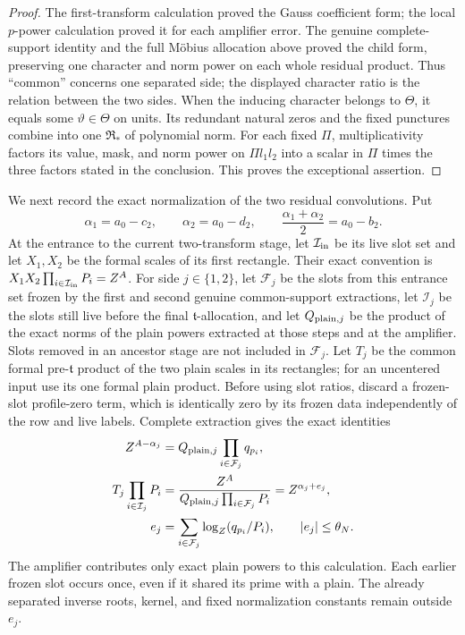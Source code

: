 \documentclass[11pt,a4paper]{article}
\numberwithin{equation}{section}
\numberwithin{figure}{section}
\theoremstyle{definition}
\theoremstyle{remark}
\begin{document}
\begin{proof}
The first-transform calculation proved the Gauss coefficient form; the
local \(p\)-power calculation proved it for each amplifier error.
The genuine complete-support identity and the full M\"obius allocation
above proved the child form, preserving one character and norm power on
each whole residual product.  Thus ``common'' concerns one separated side;
the displayed character ratio is the relation between the two sides.
When the inducing character belongs to \(\Theta\), it equals some
\(\vartheta\in\Theta\) on units.  Its redundant natural zeros and
the fixed punctures combine into one \(\mathfrak R_*\) of polynomial
norm.  For each fixed \(\Pi\), multiplicativity factors its value,
mask, and norm power on \(\Pi l_1l_2\) into a scalar in \(\Pi\)
times the three factors stated in the conclusion.  This proves the exceptional assertion.
\end{proof}

We next record the exact normalization of the two residual convolutions.  Put
\[
 \alpha_1=a_0-c_2,\qquad \alpha_2=a_0-d_2,\qquad
 \frac{\alpha_1+\alpha_2}{2}=a_0-b_2.
\]
At the entrance to the current two-transform stage, let
\(\mathcal I_{\rm in}\) be its live slot set and let \(X_1,X_2\)
be the formal scales of its first rectangle.  Their exact convention is
\(X_1X_2\prod_{i\in\mathcal I_{\rm in}}P_i=Z^A\).
For side \(j\in\{1,2\}\), let \(\mathcal F_j\) be the slots from this
entrance set frozen by the first and second genuine common-support
extractions, let \(\mathcal I_j\) be the slots still live before the
final \(\mathfrak t\)-allocation, and let \(Q_{{\rm plain},j}\) be
the product of the exact norms of the plain powers extracted at those
steps and at the amplifier.  Slots removed in an ancestor stage are not
included in \(\mathcal F_j\).  Let \(T_j\) be the common formal
pre-\(\mathfrak t\) product of the two plain scales in its rectangles;
for an uncentered input use its one formal plain product.  Before using
slot ratios, discard a frozen-slot profile-zero term, which is identically
zero by its frozen data independently of the row and live labels.
Complete extraction gives the exact identities
\[
 \begin{aligned}
 Z^{A-\alpha_j}
   &=Q_{{\rm plain},j}\prod_{i\in\mathcal F_j}q_{p_i},\\
 T_j\prod_{i\in\mathcal I_j}P_i
   &=\frac{Z^A}{Q_{{\rm plain},j}\prod_{i\in\mathcal F_j}P_i}
     =Z^{\alpha_j+e_j},\\
 e_j&=\sum_{i\in\mathcal F_j}\log_Z(q_{p_i}/P_i),
 \qquad |e_j|\le\theta_N.
 \end{aligned}
\]
The amplifier contributes only exact plain powers to this calculation.
Each earlier frozen slot occurs once, even if it shared its prime with
a plain.  The already separated inverse roots, kernel, and fixed
normalization constants remain outside \(e_j\).
\end{document}
